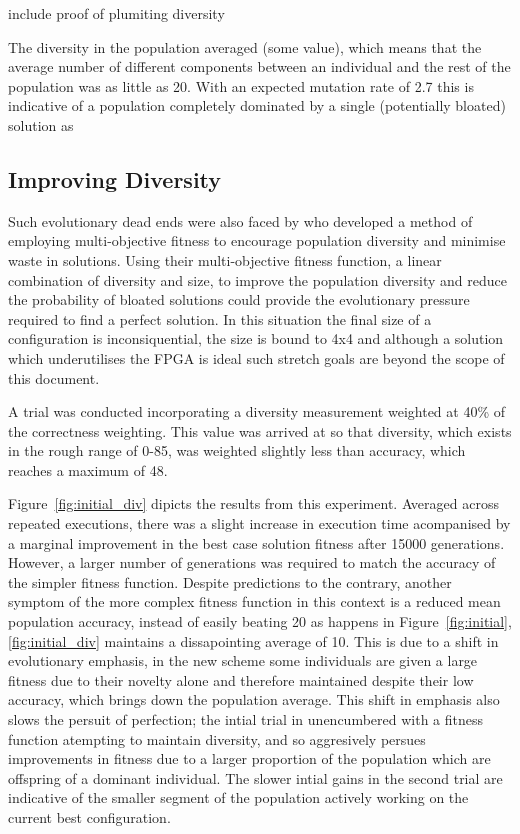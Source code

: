 \todo include proof of plumiting diversity

The diversity in the population averaged (some value), which means that the average number
of different components between an individual and the rest of the population was
as little as 20. With an expected mutation rate of 2.7 this is
indicative of a population completely dominated by a single (potentially bloated)
solution as

\subsection{Improving Diversity}
Such evolutionary
dead ends were also faced by \cite{deJong:2001:RBP:2955239.2955241} who developed
a method of employing multi-objective fitness to encourage population diversity
and minimise waste in solutions. Using their multi-objective fitness function,
a linear combination of diversity and size, to improve the population diversity
and reduce the probability of bloated solutions could provide the evolutionary
pressure required to find a perfect solution. In this situation the final size
of a configuration is inconsiquential, the size is bound to 4x4 and although
a solution which underutilises the FPGA is ideal such stretch goals are beyond
the scope of this document.

A trial was conducted incorporating a diversity measurement weighted at 40\%
of the correctness weighting. This value was arrived at so that diversity,
which exists in the rough range of 0-85, was weighted slightly less than
accuracy, which reaches a maximum of 48.

Figure~\ref{fig:initial_div} dipicts the results from this experiment. Averaged across
repeated executions, there was a slight increase in execution time acompanised by
a marginal improvement in the best case solution fitness
after 15000 generations. However, a larger number of generations was required
to match the accuracy of the simpler fitness function. Despite predictions
to the contrary, another symptom of
the more complex fitness function in this context is a reduced mean population accuracy,
instead of easily beating 20 as happens in Figure~\ref{fig:initial},
\ref{fig:initial_div} maintains a dissapointing
average of 10. This is due to a shift in evolutionary emphasis, in the new
scheme some individuals are given a large fitness due to their novelty alone
and therefore maintained despite their low accuracy, which brings down the
population average. This shift in emphasis also slows the
persuit of perfection; the intial trial in unencumbered with a fitness function
atempting to maintain diversity, and so aggresively persues improvements in
fitness due to a larger proportion of the population which are offspring of a
dominant individual. The slower intial gains in the second trial are indicative
of the smaller segment of the population actively working on the current best
configuration.

